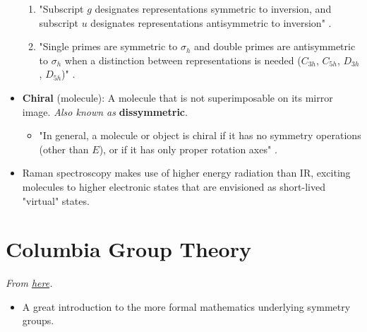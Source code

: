 \documentclass[../notes.tex]{subfiles}
\begin{document}
\begin{itemize}
\begin{enumerate}
        \item "Subscript $g$ designates representations symmetric to inversion, and subscript $u$ designates representations antisymmetric to inversion" \parencite[100]{bib:MiesslerFischerTarr}.
        \item "Single primes are symmetric to $\sigma_h$ and double primes are antisymmetric to $\sigma_h$ when a distinction between representations is needed ($C_{3h}$, $C_{5h}$, $D_{3h}$, $D_{5h}$)" \parencite[100]{bib:MiesslerFischerTarr}.
    \end{enumerate}
    \item {}\textbf{Chiral} (molecule): A molecule that is not superimposable on its mirror image. \emph{Also known as} \textbf{dissymmetric}.
    \begin{itemize}
        \item "In general, a molecule or object is chiral if it has no symmetry operations (other than $E$), or if it has only proper rotation axes" \parencite[100]{bib:MiesslerFischerTarr}.
    \end{itemize}
    \item Raman spectroscopy makes use of higher energy radiation than IR, exciting molecules to higher electronic states that are envisioned as short-lived "virtual" states.
\end{itemize}



\section{Columbia Group Theory}
\emph{From \href{http://www.math.columbia.edu/~rf/symmetric.pdf}{here}.}
\begin{itemize}
    \item A great introduction to the more formal mathematics underlying symmetry groups.
\end{itemize}
\end{document}
